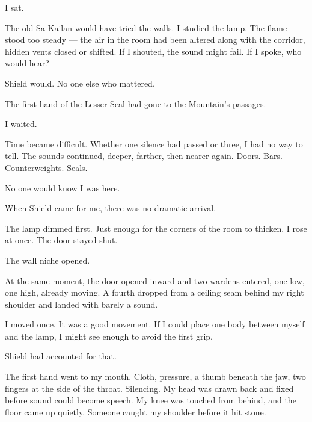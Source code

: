 I sat.\par

The old Sa-Kailan would have tried the walls. I studied the lamp. The flame stood too steady --- the air in the room had been altered along with the corridor, hidden vents closed or shifted. If I shouted, the sound might fail. If I spoke, who would hear?\par

Shield would. No one else who mattered.\par

The first hand of the Lesser Seal had gone to the Mountain's passages.\par

I waited.\par

Time became difficult. Whether one silence had passed or three, I had no way to tell. The sounds continued, deeper, farther, then nearer again. Doors. Bars. Counterweights. Seals.\par

No one would know I was here.\par

When Shield came for me, there was no dramatic arrival.\par

The lamp dimmed first. Just enough for the corners of the room to thicken. I rose at once. The door stayed shut.\par

The wall niche opened.\par

At the same moment, the door opened inward and two wardens entered, one low, one high, already moving. A fourth dropped from a ceiling seam behind my right shoulder and landed with barely a sound.\par

I moved once. It was a good movement. If I could place one body between myself and the lamp, I might see enough to avoid the first grip.\par

Shield had accounted for that.\par

The first hand went to my mouth. Cloth, pressure, a thumb beneath the jaw, two fingers at the side of the throat. Silencing. My head was drawn back and fixed before sound could become speech. My knee was touched from behind, and the floor came up quietly. Someone caught my shoulder before it hit stone.\par


